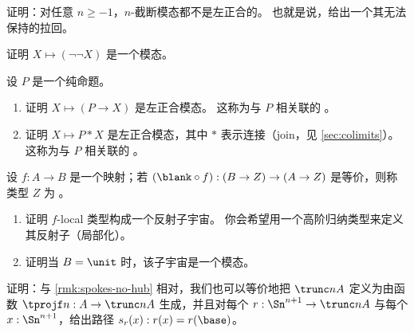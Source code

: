 \begin{ex}\label{ex:n-truncation-not-left-exact}
  证明：对任意 $n\ge -1$，$n$-截断模态都不是左正合的。
  也就是说，给出一个其无法保持的拉回。
\end{ex}

\begin{ex}\label{ex:double-negation-modality}
  证明 $X\mapsto (\neg\neg X)$ 是一个模态。%
\end{ex}

\begin{ex}\label{ex:prop-modalities}
  设 $P$ 是一个纯命题。
  \begin{enumerate}
  \item 证明 $X\mapsto (P\to X)$ 是左正合模态。
    这称为与 $P$ 相关联的
    。
  \item 证明 $X\mapsto P*X$ 是左正合模态，其中 $*$ 表示连接（join，见 \cref{sec:colimits}）。
    这称为与 $P$ 相关联的
    。
  \end{enumerate}
\end{ex}

\begin{ex}\label{ex:f-local-type}
  设 $f:A\to B$ 是一个映射；若 $(\blank\circ f):(B\to Z) \to (A\to Z)$ 是等价，则称类型 $Z$ 为
  。
  \begin{enumerate}
  \item 证明 $f$-local 类型构成一个反射子宇宙。
    你会希望用一个高阶归纳类型来定义其反射子（局部化）。
  \item 证明当 $B=\unit$ 时，该子宇宙是一个模态。
  \end{enumerate}
\end{ex}

\begin{ex}\label{ex:trunc-spokes-no-hub}
  证明：与 \cref{rmk:spokes-no-hub} 相对，我们也可以等价地把 $\trunc nA$ 定义为由函数 $\tprojf n : A \to \trunc n A$ 生成，并且对每个 $r:\Sn^{n+1} \to \trunc n A$ 与每个 $x:\Sn^{n+1}$，给出路径 $s_r(x):r(x) = r(\base)$。
\end{ex}

